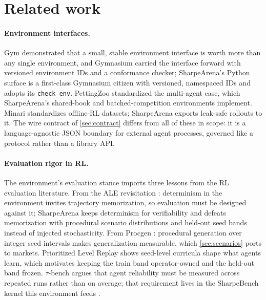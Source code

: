 \section{Related work}\label{sec:related}

\paragraph{Environment interfaces.} Gym \citep{brockman2016gym} demonstrated that a small, stable environment interface is worth more than any single environment, and Gymnasium \citep{towers2024gymnasium} carried the interface forward with versioned environment IDs and a conformance checker; SharpeArena's Python surface is a first-class Gymnasium citizen with versioned, namespaced IDs and adopts its \texttt{check\_env}. PettingZoo \citep{terry2021pettingzoo} standardized the multi-agent case, which SharpeArena's shared-book and batched-competition environments implement. Minari \citep{minari} standardizes offline-RL datasets; SharpeArena exports leak-safe rollouts to it. The wire contract of \cref{sec:contract} differs from all of these in scope: it is a language-agnostic JSON boundary for external agent processes, governed like a protocol rather than a library API.

\paragraph{Evaluation rigor in RL.} The environment's evaluation stance imports three lessons from the RL evaluation literature. From the ALE revisitation \citep{machado2018revisiting}: determinism in the environment invites trajectory memorization, so evaluation must be designed against it; SharpeArena keeps determinism for verifiability and defeats memorization with procedural scenario distributions and held-out seed bands instead of injected stochasticity. From Procgen \citep{cobbe2020procgen}: procedural generation over integer seed intervals makes generalization measurable, which \cref{sec:scenarios} ports to markets. Prioritized Level Replay \citep{jiang2021prioritized} shows seed-level curricula shape what agents learn, which motivates keeping the train band operator-owned and the held-out band frozen. $\tau$-bench \citep{yao2024taubench} argues that agent reliability must be measured across repeated runs rather than on average; that requirement lives in the SharpeBench kernel this environment feeds \citep{toca2026sharpebench}.

